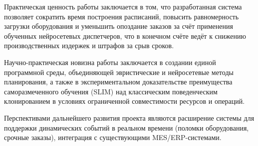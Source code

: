 Практическая ценность работы заключается в том, что разработанная система позволяет сократить время построения расписаний, повысить равномерность загрузки оборудования и уменьшить опоздание заказов за счёт применения обученных нейросетевых диспетчеров, что в конечном счёте ведёт к снижению производственных издержек и штрафов за срыв сроков.

Научно-практическая новизна работы заключается в создании единой программной среды, объединяющей эвристические и нейросетевые методы планирования, а также в экспериментальном доказательстве преимущества саморазмеченного обучения (SLIM) над классическим поведенческим клонированием в условиях ограниченной совместимости ресурсов и операций.

Перспективами дальнейшего развития проекта являются расширение системы для поддержки динамических событий в реальном времени (поломки оборудования, срочные заказы), интеграция с существующими MES/ERP-системами.
